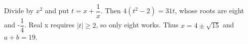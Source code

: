Divide by $x^2$ and put $t=x+\dfrac{1}{x}$. Then $4(t^2-2)=31t$, whose roots are eight and -$\dfrac{1}{4}$. Real x requires $|t|\ge2$, so only eight works. Thus $x=4\pm\sqrt{15}$ and $a+b=\boxed{19}$.
